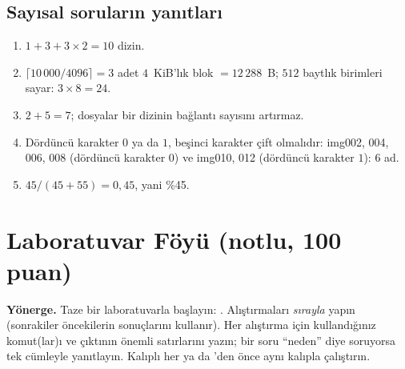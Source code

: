 \subsection*{Sayısal soruların yanıtları}
\begin{enumerate}[leftmargin=1.6em,start=7]
  \item $1 + 3 + 3 \times 2 = 10$ dizin.
  \item $\lceil 10\,000 / 4096 \rceil = 3$ adet $4$~KiB'lık blok $= 12\,288$~B;  $512$ baytlık birimleri sayar: $3 \times 8 = 24$.
  \item $2 + 5 = 7$; dosyalar bir dizinin bağlantı sayısını artırmaz.
  \item Dördüncü karakter $0$ ya da $1$, beşinci karakter çift olmalıdır: img002, 004, 006, 008 (dördüncü karakter $0$) ve img010, 012 (dördüncü karakter $1$): $6$ ad.
  \item $45/(45+55) = 0{,}45$, yani \%45.
\end{enumerate}

\section{Laboratuvar Föyü (notlu, 100 puan)}
\label{sec:lab}

\textbf{Yönerge.} Taze bir laboratuvarla başlayın: . Alıştırmaları \emph{sırayla} yapın (sonrakiler öncekilerin sonuçlarını kullanır). Her alıştırma için kullandığınız komut(lar)ı ve çıktının önemli satırlarını yazın; bir soru ``neden'' diye soruyorsa tek cümleyle yanıtlayın. Kalıplı her  ya da 'den önce aynı kalıpla  çalıştırın.

